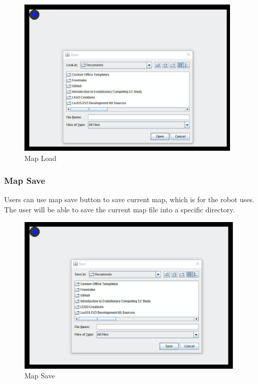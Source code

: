 \documentclass[11pt, a4paper]{article}
\begin{document}
\begin{figure}[H]
\centering
\includegraphics[height=3in]{load}
\caption[Map Load]{Map Load}
\end{figure}

\subsubsection{Map Save}
Users can use map save button to save current map, which is for the robot uses. The user will be able to save the current map file into a specific directory.

\begin{figure}[H]
\centering
\includegraphics[height=3in]{save}
\caption[Map Save]{Map Save}
\end{figure}
\newpage

\end{document}
